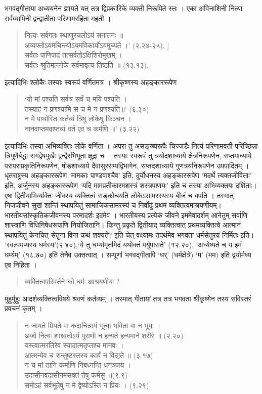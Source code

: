 भगवद्गीताया अध्ययनेन ज्ञायते यत् तत्र द्विप्रकारिके व्यक्ती निरूपिते स्तः । एका अविनाशिनी नित्या सर्वव्यापिनी द्वन्द्वातीता परिणामरहिता महती । 
\begin{verse}
नित्यः सर्वगतः स्थाणुरचलोऽयं सनातनः ॥ \\
अव्यक्तोऽयमचिन्त्योऽयमविकार्योऽयमुच्यते ।' (२.२४-२५), ]\\
सर्वतः पाणिपादं तत्सर्वतोऽक्षिशिरोमुखम् ।\\
सर्वतः श्रुतिमल्लोके सर्वमावृत्य तिष्ठति ॥ (१३.१३), 
\end{verse}
इत्यादिभिः श्लोकैः तस्याः स्वरूपं वर्णितमत्र । श्रीकृष्णस्य अहङ्काररूपेण 
\begin{verse}
‘यो मां पश्यति सर्वत्र सर्वं च मयि पश्यति । \\
तस्याहं न प्रणश्यामि स च मे न प्रणश्यति॥' (६.३०)\\
न मे पार्थास्ति कर्तव्यं त्रिषु लोकेषु किञ्चन । \\
नानवाप्तमवाप्तव्यं वर्त एव च कर्मणि ॥' (३.२२) 
\end{verse}
इत्यादिभिः तस्या अभिव्यक्तिः लोके वर्णिता ॥ अपरा तु असङ्ख्यरूपैः चिज्जडैः नित्यं परिणामवती परिच्छिन्ना त्रिगुणैर्बद्धा रागद्वेषमुखैः द्वन्द्वैरभिभूता क्षुद्रा च । तस्याः स्वरूपं तु त्रयोदशाध्याये क्षेत्रनिरूपणेन, सप्तमाध्याये परापराप्रकृतिनिरूपणेन, षोडशाध्याये दैवासुरसम्पद्विभागेन, सप्तदशाध्याये गुणत्रयनिरूपणेन उपपादितम् । धृतराष्ट्रस्य अहङ्काररूपेण ‘मामकाः पाण्डवाश्चैव' इति, दुर्योधनस्य अहङ्काररूपेण ‘मदर्थे त्यक्तजीविताः' इति, अर्जुनस्य अहङ्काररूपेण ‘यदि मामप्रतीकारमशस्त्रं शस्त्रपाणयः' इति च तस्या अभिव्यक्तयः दर्शिताः। एषा द्वितीयाभिव्यक्तिः जीवस्य व्यक्तित्वं सङ्कोचयति लोकेऽसामरस्यस्य बीजं च वपति । तस्मात् निजजीवने सुखं शान्तिं स्थापयितुं सामाजिकसामरस्यं च निर्वोढुं प्रथमं व्यक्तित्वमाश्रयणीयम्। भारतीयसांस्कृतिकजीवनस्य परमादर्शः इदमेव । भारतीयस्य प्रत्येकं जीवने इममेवादर्शम् आनेतुम् सर्वाणि शास्त्राणि विधिनिषेधरूपाणि नियोजितानि। किन्तु प्रकृते द्वितीयाद् व्यक्तित्वात् प्रथमव्यक्तित्वे आत्मानं स्थापयितुं केनचित् सेतुना विना कथं शक्यते? इति चेत् वक्ष्यामः तदर्थमेव भगवता धर्मसेतुरयं निर्मितः इति। ‘स्वल्पमप्यस्य धर्मस्य'(२.४०),‘ये तु धर्म्यामृतमिदं यथोक्तं पर्युपासते' (१२.२०), ‘अध्येष्यते च य इमं धर्म्यम्' (१८.७०) इति तेनैव उक्तत्वात् । सम्पूर्णा भगवद्गीतापि ‘धर्' (धर्मक्षेत्रे) ‘म' (मम) इति द्वयोर्मध्य एव निहिता ।
\begin{verse}
व्यक्तित्वपरिवर्तने को धर्मः आश्रयणीयः ?
\end{verse}
मुहुर्मुहुः आदर्शव्यक्तित्वविषये श्रवणं कर्तव्यम् । तस्मात् गीतायां तत्र तत्र भगवता श्रीकृष्णेन तस्य सविस्तरं प्रवचनं कृतम् । 
\begin{verse}
न जायते म्रियते वा कदाचिन्नायं भूत्वा भविता वा न भूयः । \\
अजो नित्यः शाश्वतोऽयं पुराणो न हन्यते हन्यमाने शरीरे ॥ (२.२०) \\
यस्त्वात्मरतिरेव स्यादात्मतृप्तश्च मानवः । \\
आत्मन्येव च सन्तुष्टस्तस्य कार्यं न विद्यते ॥ (३.१७)\\
न च मां तानि कर्माणि निबध्नन्ति धनञ्जय । \\
उदासीनवदासीनमसक्तं तेषु कर्मसु ॥(९.९)\\
समोऽहं सर्वभूतेषु न मे द्वेष्योऽस्ति न प्रियः । (९.२९)
\end{verse}
